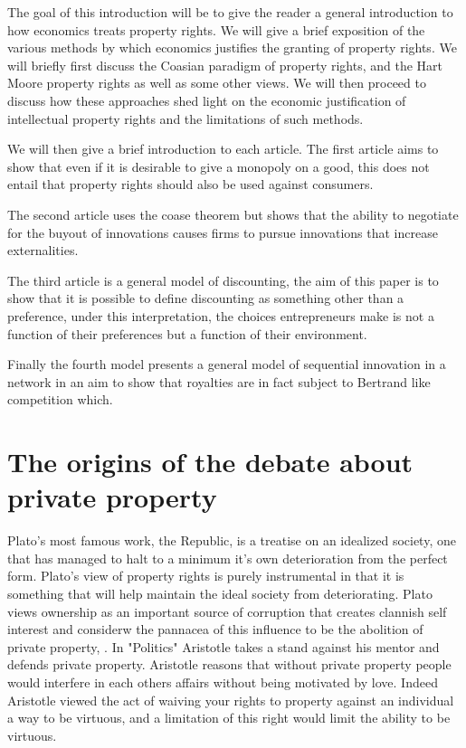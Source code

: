 \documentclass[12pt]{article}
\numberwithin{equation}{section}
\begin{document}
The goal of this introduction will be to give the reader a general introduction to how economics treats property rights. We will give a brief exposition of the various methods by which economics justifies the granting of property rights. We will briefly first discuss the Coasian paradigm of property rights, and the Hart Moore property rights as well as some other views. We will then proceed to discuss how these approaches shed light on the economic justification of intellectual property rights and the limitations of such methods. 

We will then give a brief introduction to each article. 
The first article aims to show that even if it is desirable to give a monopoly on a good, this does not entail that property rights should also be used against consumers. 

The second article uses the coase theorem but shows that the ability to negotiate for the buyout of innovations causes firms to pursue innovations that increase externalities. 

The third article is a general model of discounting, the aim of this paper is to show that it is possible to define discounting as something other than a preference, under this interpretation, the choices entrepreneurs make is not a function of their preferences but a function of their environment. 

Finally the fourth model presents a general model of sequential innovation in a network in an aim to show that royalties are in fact subject to Bertrand like competition which.

\section{The origins of the debate about private property}

Plato's most famous work, the Republic, is a treatise on an idealized society, one that has managed to halt to a minimum it's own deterioration from the perfect form. Plato's view of property rights is purely instrumental in that it is something that will help maintain the ideal society from deteriorating. Plato views ownership as an important source of corruption that creates clannish self interest and considerw the pannacea of this influence to be the abolition of private property,
. 
In "Politics" Aristotle takes a stand against his mentor and defends private property. Aristotle reasons that without private property people would interfere in each others affairs without being motivated by love. Indeed Aristotle viewed the act of waiving your rights to property against an individual a way to be virtuous, and a limitation of this right would limit the ability to be virtuous.
\end{document}
